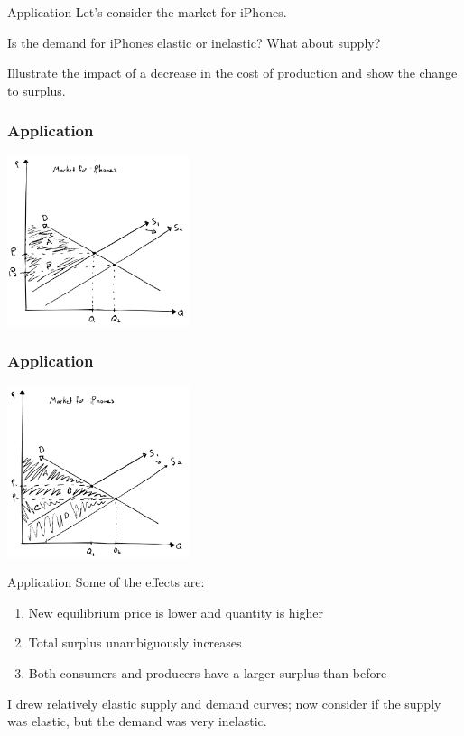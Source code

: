 \documentclass[aspectratio=169]{beamer}
\begin{document}
\begin{frame}{Application}
    Let's consider the market for iPhones.

    \vspace{2mm}

    Is the demand for iPhones elastic or inelastic? What about supply?

    \vspace{2mm}

    Illustrate the impact of a decrease in the cost of production and show the change to surplus.
\end{frame}

\begin{frame}
    \frametitle{Application}
    \centering
    \includegraphics[width = 0.4\textwidth,keepaspectratio]{iphone1.png}
\end{frame}

\begin{frame}
    \frametitle{Application}
    \centering
    \includegraphics[width = 0.4\textwidth,keepaspectratio]{iphone2.png}
\end{frame}

\begin{frame}{Application}
    Some of the effects are:
    \begin{enumerate}
        \item New equilibrium price is lower and quantity is higher
        \item Total surplus unambiguously increases
        \item Both consumers and producers have a larger surplus than before
    \end{enumerate}
    
    I drew relatively elastic supply and demand curves; now consider if the supply was elastic, but the demand was very inelastic.
\end{frame}
\end{document}
